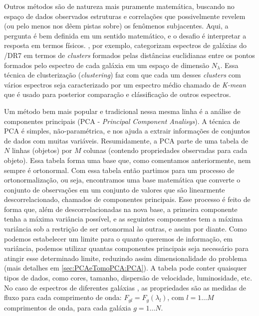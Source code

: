 Outros métodos são de natureza mais puramente matemática, buscando no espaço de dados observados estruturas e
correlações que possivelmente revelem (ou pelo menos nos dêem pistas sobre) os fenômenos subjacentes. Aqui, a pergunta é
bem definida em um sentido matemático, e o desafio é interpretar a resposta em termos físicos.
\citet{SanchezAlmeida2010}, por exemplo, categorizam espectros de galáxias do \SDSS/DR7 em termos de {\em clusters}
formados pelas distâncias euclidianas entre os pontos formados pelo espectro de cada galáxia em um espaço de dimensão
$N_\lambda$. Essa técnica de clusterização ({\em clustering}) faz com que cada um desses {\em clusters} com vários
espectros seja caracterizado por um espectro médio chamado de {\em K-mean} que é usado para posterior comparação e
clássificação de outros espectros.

Um método bem mais popular e tradicional nessa mesma linha é a análise de componentes principais (PCA - {\em Principal
Component Analisys}). A técnica de PCA é simples, não-paramétrica, e nos ajuda a extrair informações de conjuntos de
dados com muitas variáveis. Resumidamente, a PCA parte de uma tabela de $N$ linhas (objetos) por $M$ colunas (contendo
propriedades observadas para cada objeto). Essa tabela forma uma base que, como comentamos anteriormente, nem sempre é
ortonormal. Com essa tabela então partimos para um processo de ortonormalização, ou seja, encontramos uma base
matemática que converte o conjunto de observações em um conjunto de valores que são linearmente descorrelacionado,
chamados de componentes principais. Esse processo é feito de forma que, além de descorrelacionadas na nova base, a
primeira componente tenha a máxima variância possível, e as seguintes componentes tem a máxima variância sob a restrição
de ser ortonormal às outras, e assim por diante. Como podemos estabelecer um limite para o quanto queremos de
informação, em variância, podemos utilizar quantas componentes principais seja necessário para atingir esse determinado
limite, reduzindo assim dimensionalidade do problema (mais detalhes em \ref{sec:PCAeTomoPCA:PCA}). A tabela pode conter
quaisquer tipos de dados, como cores, tamanho, dispersão de velocidade, luminosidade, etc. No caso de espectros de
diferentes galáxias \citep[e.g., ][]{Francis1992, Sodre1994, Sodre1997}, as propriedades são as medidas de fluxo para
cada comprimento de onda: $F_{gl} = F_g(\lambda_l)$, com $l = 1 \ldots M$ comprimentos de onda, para cada galáxia $g = 1
\ldots N$.

